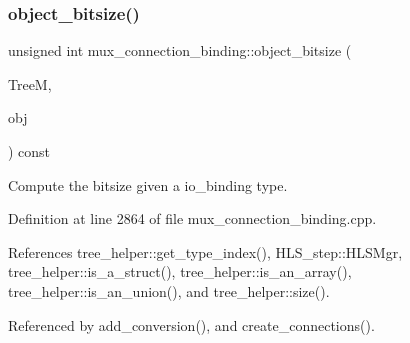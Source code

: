 \subsubsection{\texorpdfstring{object\+\_\+bitsize()}{object\_bitsize()}}
{\footnotesize\ttfamily unsigned int mux\+\_\+connection\+\_\+binding\+::object\+\_\+bitsize (\begin{DoxyParamCaption}\item[{const \hyperlink{tree__manager_8hpp_a96ff150c071ce11a9a7a1e40590f205e}{tree\+\_\+manager\+Ref}}]{TreeM,  }\item[{const \hyperlink{classHLS__manager_a972627cc658afa992590b9d2bf1a1e87}{H\+L\+S\+\_\+manager\+::io\+\_\+binding\+\_\+type} \&}]{obj }\end{DoxyParamCaption}) const\hspace{0.3cm}{\ttfamily [private]}}



Compute the bitsize given a io\+\_\+binding type. 



Definition at line 2864 of file mux\+\_\+connection\+\_\+binding.\+cpp.



References tree\+\_\+helper\+::get\+\_\+type\+\_\+index(), H\+L\+S\+\_\+step\+::\+H\+L\+S\+Mgr, tree\+\_\+helper\+::is\+\_\+a\+\_\+struct(), tree\+\_\+helper\+::is\+\_\+an\+\_\+array(), tree\+\_\+helper\+::is\+\_\+an\+\_\+union(), and tree\+\_\+helper\+::size().



Referenced by add\+\_\+conversion(), and create\+\_\+connections().

